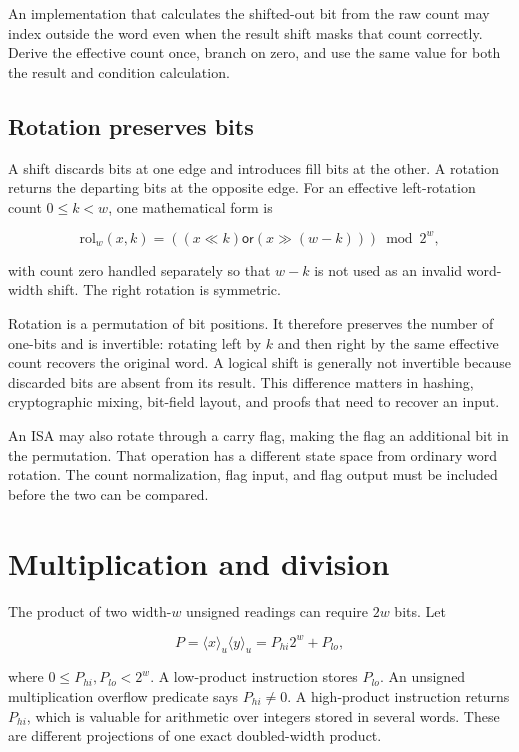 \begin{warning}[title={Normalize the count before indexing a bit}]
An implementation that calculates the shifted-out bit from the raw count may
index outside the word even when the result shift masks that count correctly.
Derive the effective count once, branch on zero, and use the same value for
both the result and condition calculation.
\end{warning}

\subsection{Rotation preserves bits}

A shift discards bits at one edge and introduces fill bits at the other. A
rotation returns the departing bits at the opposite edge. For an effective
left-rotation count \(0\leq k<w\), one mathematical form is

\[
  \mathrm{rol}_w(x,k)=
  ((x\ll k)\mathbin{\mathsf{or}}(x\gg(w-k)))\bmod 2^w,
\]

with count zero handled separately so that \(w-k\) is not used as an invalid
word-width shift. The right rotation is symmetric.

Rotation is a permutation of bit positions. It therefore preserves the number
of one-bits and is invertible: rotating left by \(k\) and then right by the
same effective count recovers the original word. A logical shift is generally
not invertible because discarded bits are absent from its result. This
difference matters in hashing, cryptographic mixing, bit-field layout, and
proofs that need to recover an input.

An ISA may also rotate through a carry flag, making the flag an additional bit
in the permutation. That operation has a different state space from ordinary
word rotation. The count normalization, flag input, and flag output must be
included before the two can be compared.

\section{Multiplication and division}

The product of two width-\(w\) unsigned readings can require \(2w\) bits. Let

\[
  P=\langle x\rangle_u\langle y\rangle_u
   =P_{hi}2^w+P_{lo},
\]

where \(0\leq P_{hi},P_{lo}<2^w\). A low-product instruction stores
\(P_{lo}\). An unsigned multiplication overflow predicate says
\(P_{hi}\ne0\). A high-product instruction returns \(P_{hi}\), which is
valuable for arithmetic over integers stored in several words. These are different projections of
one exact doubled-width product.

